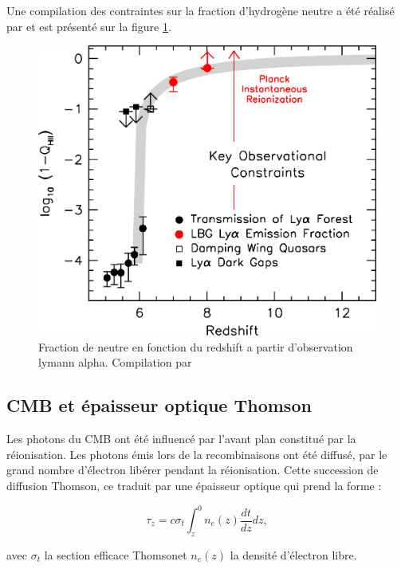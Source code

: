 Une compilation des contraintes sur la fraction d'hydrogène neutre a été réalisé par \cite{2015ApJ...811..140B} et est présenté sur la figure \ref{fig:compile_constrains}.

\begin{figure}[bth]
        \includegraphics[width=.95\linewidth]{img/01/xionconstrains.jpg} 
        \caption{Fraction de neutre en fonction du redshift a partir d'observation lymann alpha.
        Compilation par \cite{2015ApJ...811..140B}}
 		\label{fig:compile_constrains}
\end{figure}




\subsection{CMB et épaisseur optique Thomson}


Les photons du CMB ont été influencé par l'avant plan constitué par la réionisation.
Les photons émis lors de la recombinaisons ont été diffusé, par le grand nombre d'électron libérer pendant la réionisation.
Cette succession de diffusion Thomson, ce traduit par une épaisseur optique qui prend la forme : 

\begin{equation}
\tau_z = c \sigma_t \int_z^0 n_e (z) \frac{dt}{dz} dz,
\end{equation}

avec $\sigma_t$ la section efficace Thomsonet $n_e (z)$ la densité d'électron libre.

